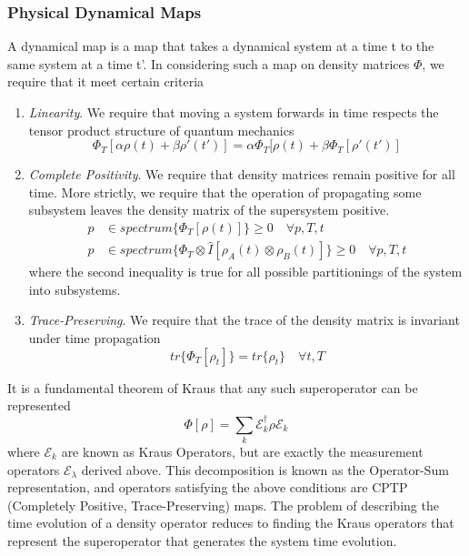  \subsubsection{Physical Dynamical Maps} 
A dynamical map is a map that takes a dynamical system at a time t to the same system at a time t'. In considering such a map on density matrices $\Phi$, we require that it meet certain criteria
\begin{enumerate}
    \item \emph{Linearity}. We require that moving a system forwards in time respects the tensor product structure of quantum mechanics
        \begin{equation}
            \Phi_T[\alpha\rho(t) + \beta\rho'(t')] = \alpha \Phi_T[\rho(t) + \beta \Phi_T[\rho'(t')]
        \end{equation}
    \item \emph{Complete Positivity}. We require that density matrices remain positive for all time. More strictly, we require that the operation of propagating some subsystem leaves the density matrix of the supersystem positive. 
        \begin{align}
            p & \in  spectrum \{\Phi_T[\rho(t)]\} \geq  0\quad \forall p, T, t\\
            p & \in  spectrum \{\Phi_T \otimes \hat{I} [\rho_A(t) \otimes\rho_B(t) ] \} \geq 0 \quad \forall p, T, t
        \end{align}
        where the second inequality is true for all possible partitionings of the system into subsystems.
    \item \emph{Trace-Preserving}. We require that the trace of the density matrix is invariant under time propagation
        \begin{equation}
            tr\{ \Phi_T[\rho_t] \} = tr \{ \rho_t \} \quad \forall t, T
        \end{equation}
\end{enumerate}
It is a fundamental theorem of Kraus \cite{Kraus1983} that any such superoperator can be represented\cite{Nielsen2010}
\begin{equation}
    \Phi[\rho] = \sum_k \mathscr{E}_k^\dagger \rho \mathscr{E}_k
\end{equation}
where $\mathscr{E}_k $ are known as Kraus Operators, but are exactly the measurement operators $\mathscr{E}_\lambda$ derived above. This decomposition is known as the Operator-Sum representation\cite{Nielsen2010}, and operators satisfying the above conditions are CPTP (Completely Positive, Trace-Preserving) maps. The problem of describing the time evolution of a density operator reduces to finding the Kraus operators that represent the superoperator that generates the system time evolution. 

